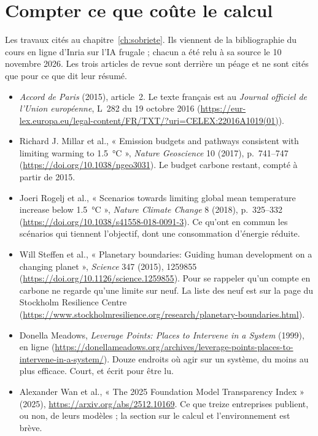\section*{Compter ce que coûte le calcul}
Les travaux cités au chapitre~\ref{ch:sobriete}. Ils viennent de la bibliographie du cours
en ligne d'Inria sur l'IA frugale ; chacun a été relu à sa source le 10 novembre 2026. Les
trois articles de revue sont derrière un péage et ne sont cités que pour ce que dit leur
résumé.
\begin{itemize}
  \item \emph{Accord de Paris} (2015), article~2. Le texte français est au \emph{Journal
        officiel de l'Union européenne}, L~282 du 19 octobre 2016
        (\url{https://eur-lex.europa.eu/legal-content/FR/TXT/?uri=CELEX:22016A1019(01)}).
  \item Richard J. Millar et al., « Emission budgets and pathways consistent with limiting
        warming to 1.5~°C », \emph{Nature Geoscience} 10 (2017), p.~741--747
        (\url{https://doi.org/10.1038/ngeo3031}). Le budget carbone restant, compté à
        partir de 2015.
  \item Joeri Rogelj et al., « Scenarios towards limiting global mean temperature increase
        below 1.5~°C », \emph{Nature Climate Change} 8 (2018), p.~325--332
        (\url{https://doi.org/10.1038/s41558-018-0091-3}). Ce qu'ont en commun les
        scénarios qui tiennent l'objectif, dont une consommation d'énergie réduite.
  \item Will Steffen et al., « Planetary boundaries: Guiding human development on a
        changing planet », \emph{Science} 347 (2015), 1259855
        (\url{https://doi.org/10.1126/science.1259855}). Pour se rappeler qu'un compte en
        carbone ne regarde qu'une limite sur neuf. La liste des neuf est sur la page du
        Stockholm Resilience Centre
        (\url{https://www.stockholmresilience.org/research/planetary-boundaries.html}).
  \item Donella Meadows, \emph{Leverage Points: Places to Intervene in a System} (1999),
        en ligne
        (\url{https://donellameadows.org/archives/leverage-points-places-to-intervene-in-a-system/}).
        Douze endroits où agir sur un système, du moins au plus efficace. Court, et écrit
        pour être lu.
  \item Alexander Wan et al., « The 2025 Foundation Model Transparency Index » (2025),
        \url{https://arxiv.org/abs/2512.10169}. Ce que treize entreprises publient, ou
        non, de leurs modèles ; la section sur le calcul et l'environnement est brève.
\end{itemize}

